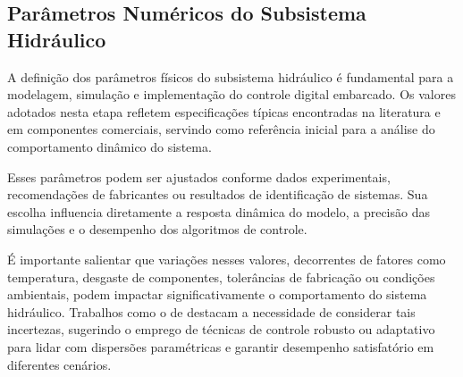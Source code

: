 \subsection{Parâmetros Numéricos do Subsistema Hidráulico}
\label{sec:controle-4-1-5}

A definição dos parâmetros físicos do subsistema hidráulico é fundamental para a modelagem, simulação e implementação do controle digital embarcado. Os valores adotados nesta etapa refletem especificações típicas encontradas na literatura e em componentes comerciais, servindo como referência inicial para a análise do comportamento dinâmico do sistema.

\begin{table}[h!] 
\end{table}

Esses parâmetros podem ser ajustados conforme dados experimentais, recomendações de fabricantes ou resultados de identificação de sistemas. Sua escolha influencia diretamente a resposta dinâmica do modelo, a precisão das simulações e o desempenho dos algoritmos de controle.

É importante salientar que variações nesses valores, decorrentes de fatores como temperatura, desgaste de componentes, tolerâncias de fabricação ou condições ambientais, podem impactar significativamente o comportamento do sistema hidráulico. Trabalhos como o de  destacam a necessidade de considerar tais incertezas, sugerindo o emprego de técnicas de controle robusto ou adaptativo para lidar com dispersões paramétricas e garantir desempenho satisfatório em diferentes cenários.

